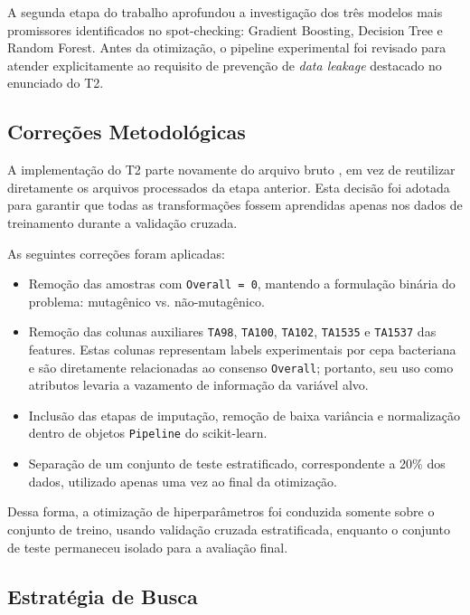 \documentclass[12pt,a4paper]{article}
\begin{document}
A segunda etapa do trabalho aprofundou a investigação dos três modelos mais promissores identificados no spot-checking: Gradient Boosting, Decision Tree e Random Forest. Antes da otimização, o pipeline experimental foi revisado para atender explicitamente ao requisito de prevenção de \textit{data leakage} destacado no enunciado do T2.

\subsection{Correções Metodológicas}

A implementação do T2 parte novamente do arquivo bruto , em vez de reutilizar diretamente os arquivos processados da etapa anterior. Esta decisão foi adotada para garantir que todas as transformações fossem aprendidas apenas nos dados de treinamento durante a validação cruzada.

As seguintes correções foram aplicadas:

\begin{itemize}
    \item Remoção das amostras com \texttt{Overall = 0}, mantendo a formulação binária do problema: mutagênico vs. não-mutagênico.
    \item Remoção das colunas auxiliares \texttt{TA98}, \texttt{TA100}, \texttt{TA102}, \texttt{TA1535} e \texttt{TA1537} das features. Estas colunas representam labels experimentais por cepa bacteriana e são diretamente relacionadas ao consenso \texttt{Overall}; portanto, seu uso como atributos levaria a vazamento de informação da variável alvo.
    \item Inclusão das etapas de imputação, remoção de baixa variância e normalização dentro de objetos \texttt{Pipeline} do scikit-learn.
    \item Separação de um conjunto de teste estratificado, correspondente a 20\% dos dados, utilizado apenas uma vez ao final da otimização.
\end{itemize}

Dessa forma, a otimização de hiperparâmetros foi conduzida somente sobre o conjunto de treino, usando validação cruzada estratificada, enquanto o conjunto de teste permaneceu isolado para a avaliação final.

\subsection{Estratégia de Busca}
\end{document}
